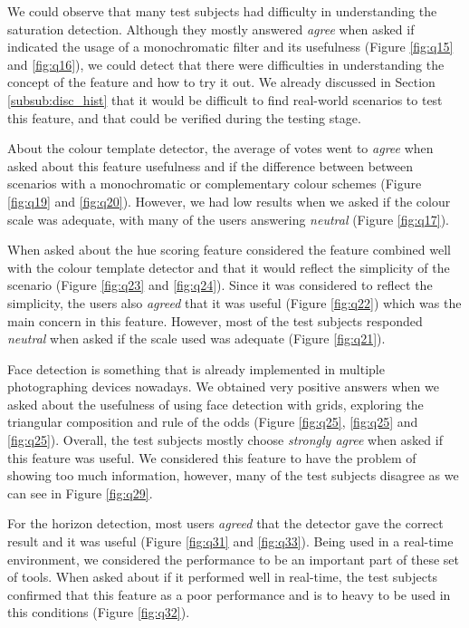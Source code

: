 We could observe that many test subjects had difficulty in understanding the saturation detection. Although they mostly answered \emph{agree} when asked if indicated the usage of a monochromatic filter and its usefulness (Figure \ref{fig:q15} and \ref{fig:q16}), we could detect that there were difficulties in understanding the concept of the feature and how to try it out. We already discussed in Section \ref{subsub:disc_hist} that it would be difficult to find real-world scenarios to test this feature, and that could be verified during the testing stage.

About the colour template detector, the average of votes went to \emph{agree} when asked about this feature usefulness and if the difference between between scenarios with a monochromatic or complementary colour schemes (Figure \ref{fig:q19} and \ref{fig:q20}). However, we had low results when we asked if the colour scale was adequate, with many of the users answering \emph{neutral} (Figure \ref{fig:q17}).

When asked about the hue scoring feature considered the feature combined well with the colour template detector and that it would reflect the simplicity of the scenario (Figure \ref{fig:q23} and \ref{fig:q24}). Since it was considered to reflect the simplicity, the users also \emph{agreed} that it was useful (Figure \ref{fig:q22}) which was the main concern in this feature. However, most of the test subjects responded \emph{neutral} when asked if the scale used was adequate (Figure \ref{fig:q21}). 

Face detection is something that is already implemented in multiple photographing devices nowadays. We obtained very positive answers when we asked about the usefulness of using face detection with grids, exploring the triangular composition and rule of the odds (Figure \ref{fig:q25}, \ref{fig:q25} and \ref{fig:q25}). Overall, the test subjects mostly choose \emph{strongly agree} when asked if this feature was useful. We considered this feature to have the problem of showing too much information, however, many of the test subjects disagree as we can see in Figure \ref{fig:q29}.

For the horizon detection, most users \emph{agreed} that the detector gave the correct result and it was useful (Figure \ref{fig:q31} and \ref{fig:q33}). Being used in a real-time environment, we considered the performance to be an important part of these set of tools. When asked about if it performed well in real-time, the test subjects confirmed that this feature as a poor performance and is to heavy to be used in this conditions (Figure \ref{fig:q32}).

